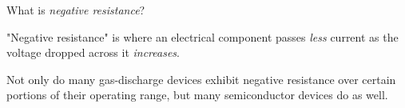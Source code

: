 

What is {\it negative resistance}?







"Negative resistance" is where an electrical component passes {\it less} current as the voltage dropped across it {\it increases}.







Not only do many gas-discharge devices exhibit negative resistance over certain portions of their operating range, but many semiconductor devices do as well.





